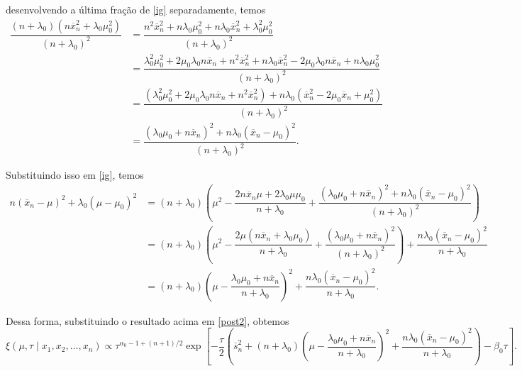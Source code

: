 \documentclass{article}
\begin{document}
\noindent desenvolvendo a última fração de \ref{ig} separadamente, temos
\begin{equation*}
    \begin{split}
        \dfrac{\left(n + \lambda_0\right)\left(n\overline{x}_n^2 + \lambda_0\mu_0^2\right)}{\left(n + \lambda_0\right)^2} & = \dfrac{n^2\overline{x}_n^2 + n\lambda_0\mu_0^2 + n\lambda_0\overline{x}_n^2 + \lambda_0^2\mu_0^2}{\left(n + \lambda_0\right)^2} \\
        & = \dfrac{\lambda_0^2\mu_0^2 + 2\mu_0\lambda_0n\overline{x}_n + n^2\overline{x}_n^2 + n\lambda_0\overline{x}_n^2 - 2\mu_0\lambda_0n\overline{x}_n + n\lambda_0\mu_0^2}{\left(n + \lambda_0\right)^2} \\
        & = \dfrac{\left(\lambda_0^2\mu_0^2 + 2\mu_0\lambda_0n\overline{x}_n + n^2\overline{x}_n^2\right) + n\lambda_0 \left(\overline{x}_n^2 - 2\mu_0\overline{x}_n + \mu_0^2\right)}{\left(n + \lambda_0\right)^2} \\
        & = \dfrac{\left(\lambda_0\mu_0 + n\overline{x}_n\right)^2 + n\lambda_0 \left(\overline{x}_n - \mu_0\right)^2}{\left(n + \lambda_0\right)^2}.
    \end{split}
\end{equation*}

Substituindo isso em \ref{ig}, temos
\begin{equation*}
    \begin{split}
        n\left(\overline{x}_n - \mu\right)^2 + \lambda_0\left(\mu - \mu_0\right)^2 & = (n + \lambda_0)\left(\mu^2 - \dfrac{2n\overline{x}_n\mu + 2\lambda_0\mu\mu_0}{n + \lambda_0} + \dfrac{\left(\lambda_0\mu_0 + n\overline{x}_n\right)^2 +  n\lambda_0 \left(\overline{x}_n - \mu_0\right)^2}{\left(n + \lambda_0\right)^2}\right) \\
        & = (n + \lambda_0)\left(\mu^2 - \dfrac{2\mu \left(n\overline{x}_n + \lambda_0\mu_0\right)}{n + \lambda_0} + \dfrac{\left(\lambda_0\mu_0 + n\overline{x}_n\right)^2}{\left(n + \lambda_0\right)^2}\right) + \dfrac{n\lambda_0 \left(\overline{x}_n - \mu_0\right)^2}{n + \lambda_0} \\
        & = (n + \lambda_0)\left(\mu - \dfrac{\lambda_0\mu_0 + n\overline{x}_n}{n + \lambda_0}\right)^2 + \dfrac{n\lambda_0 \left(\overline{x}_n - \mu_0\right)^2}{n + \lambda_0}.
    \end{split}
\end{equation*}

Dessa forma, substituindo o resultado acima em \ref{post2}, obtemos
\begin{equation*}
    \xi(\mu, \tau \mid x_1, x_2, \dots, x_n) \propto \tau^{\alpha_0 - 1 + (n + 1)/2} \exp{\left[-\dfrac{\tau}{2}\left(\overline{s}_n^2 + (n + \lambda_0)\left(\mu - \dfrac{\lambda_0\mu_0 + n\overline{x}_n}{n + \lambda_0}\right)^2 + \dfrac{n\lambda_0 \left(\overline{x}_n - \mu_0\right)^2}{n + \lambda_0}\right) - \beta_0 \tau\right]}.
\end{equation*}
\end{document}
